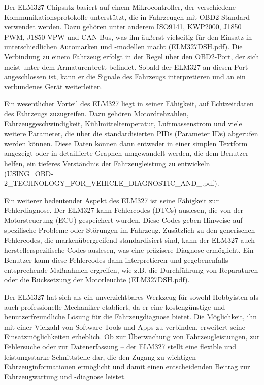 \documentclass[oneside]{ausarbeitung}
\begin{document}
Der ELM327-Chipsatz basiert auf einem Mikrocontroller, der verschiedene Kommunikationsprotokolle unterstützt, die in Fahrzeugen mit OBD2-Standard verwendet werden. Dazu gehören unter anderem ISO9141, KWP2000, J1850 PWM, J1850 VPW und CAN-Bus, was ihn äußerst vielseitig für den Einsatz in unterschiedlichen Automarken und -modellen macht (ELM327DSH.pdf). Die Verbindung zu einem Fahrzeug erfolgt in der Regel über den OBD2-Port, der sich meist unter dem Armaturenbrett befindet. Sobald der ELM327 an diesen Port angeschlossen ist, kann er die Signale des Fahrzeugs interpretieren und an ein verbundenes Gerät weiterleiten.

Ein wesentlicher Vorteil des ELM327 liegt in seiner Fähigkeit, auf Echtzeitdaten des Fahrzeugs zuzugreifen. Dazu gehören Motordrehzahlen, Fahrzeuggeschwindigkeit, Kühlmitteltemperatur, Luftmassenstrom und viele weitere Parameter, die über die standardisierten PIDs (Parameter IDs) abgerufen werden können. Diese Daten können dann entweder in einer simplen Textform angezeigt oder in detaillierte Graphen umgewandelt werden, die dem Benutzer helfen, ein tieferes Verständnis der Fahrzeugleistung zu entwickeln (USING\_OBD-2\_TECHNOLOGY\_FOR\_VEHICLE\_DIAGNOSTIC\_AND\_.pdf).

Ein weiterer bedeutender Aspekt des ELM327 ist seine Fähigkeit zur Fehlerdiagnose. Der ELM327 kann Fehlercodes (DTCs) auslesen, die von der Motorsteuerung (ECU) gespeichert wurden. Diese Codes geben Hinweise auf spezifische Probleme oder Störungen im Fahrzeug. Zusätzlich zu den generischen Fehlercodes, die markenübergreifend standardisiert sind, kann der ELM327 auch herstellerspezifische Codes auslesen, was eine präzisere Diagnose ermöglicht. Ein Benutzer kann diese Fehlercodes dann interpretieren und gegebenenfalls entsprechende Maßnahmen ergreifen, wie z.B. die Durchführung von Reparaturen oder die Rücksetzung der Motorleuchte (ELM327DSH.pdf).

Der ELM327 hat sich als ein unverzichtbares Werkzeug für sowohl Hobbyisten als auch professionelle Mechaniker etabliert, da er eine kostengünstige und benutzerfreundliche Lösung für die Fahrzeugdiagnose bietet. Die Möglichkeit, ihn mit einer Vielzahl von Software-Tools und Apps zu verbinden, erweitert seine Einsatzmöglichkeiten erheblich. Ob zur Überwachung von Fahrzeugleistungen, zur Fehlersuche oder zur Datenerfassung – der ELM327 stellt eine flexible und leistungsstarke Schnittstelle dar, die den Zugang zu wichtigen Fahrzeuginformationen ermöglicht und damit einen entscheidenden Beitrag zur Fahrzeugwartung und -diagnose leistet.
\end{document}
